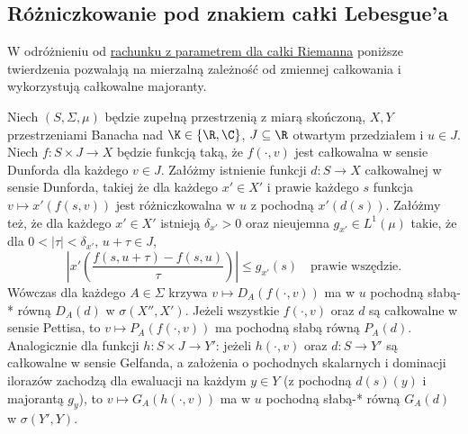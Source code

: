\subsection{Różniczkowanie pod znakiem całki Lebesgue'a}

W odróżnieniu od \hyperref[thm:parametric-integral15a]{rachunku z parametrem dla całki Riemanna}
poniższe twierdzenia pozwalają na mierzalną zależność
od zmiennej całkowania i wykorzystują całkowalne majoranty.

\begin{twierdzenie}
\label{thm:weak-parametric-differentiation15b}
Niech $(S,\Sigma,\mu)$ będzie zupełną przestrzenią z
miarą skończoną, $X,Y$ przestrzeniami Banacha nad
$\K\in\{\R,\C\}$, $J\subseteq\R$ otwartym przedziałem
i $u\in J$. Niech $f:S\times J\to X$ będzie funkcją taką, że
$f(\cdot,v)$ jest całkowalna w sensie Dunforda dla
każdego $v\in J$. Załóżmy istnienie funkcji $d:S\to X$
całkowalnej w sensie Dunforda, takiej że dla każdego
$x'\in X'$ i prawie każdego $s$ funkcja
$v\mapsto x'(f(s,v))$ jest różniczkowalna w $u$
z pochodną $x'(d(s))$. Załóżmy też, że dla każdego
$x'\in X'$ istnieją $\delta_{x'}>0$ oraz nieujemna
$g_{x'}\in L^1(\mu)$ takie, że dla
$0<|\tau|<\delta_{x'}$, $u+\tau\in J$,
\[
 \left|x'\left(\frac{f(s,u+\tau)-f(s,u)}{\tau}\right)\right|
 \le g_{x'}(s)\quad\text{prawie wszędzie}.
\]
Wówczas dla każdego $A\in\Sigma$ krzywa
$v\mapsto D_A(f(\cdot,v))$ ma w $u$ pochodną słabą-*
równą $D_A(d)$ w $\sigma(X'',X')$.
Jeżeli wszystkie $f(\cdot,v)$ oraz $d$ są całkowalne
w sensie Pettisa, to $v\mapsto P_A(f(\cdot,v))$
ma pochodną słabą równą $P_A(d)$.
Analogicznie dla funkcji $h:S\times J\to Y'$:
jeżeli $h(\cdot,v)$ oraz $d:S\to Y'$ są całkowalne
w sensie Gelfanda, a założenia o pochodnych skalarnych
i dominacji ilorazów zachodzą dla ewaluacji na każdym
$y\in Y$ (z pochodną $d(s)(y)$ i majorantą $g_y$),
to $v\mapsto G_A(h(\cdot,v))$ ma w $u$ pochodną
słabą-* równą $G_A(d)$ w $\sigma(Y',Y)$.
\end{twierdzenie}

